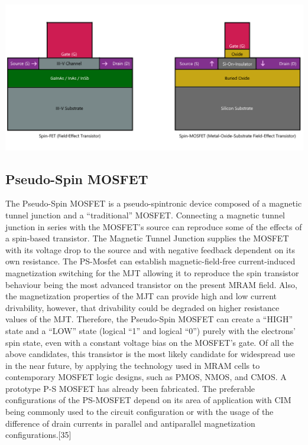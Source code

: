 \documentclass{article}
\begin{document}
\begin{center}
\includegraphics[scale=0.4]{SpinTransistorsBantis.png}
\end{center}

\subsection{Pseudo-Spin MOSFET}
The Pseudo-Spin MOSFET is a pseudo-spintronic device composed of a magnetic tunnel junction and a  “traditional” MOSFET. Connecting a magnetic tunnel junction in series with the MOSFET’s source can reproduce some of the effects of a spin-based transistor. The Magnetic Tunnel Junction supplies the MOSFET with its voltage drop to the source and with negative feedback dependent on its own resistance. The PS-Mosfet can establish magnetic-field-free current-induced magnetization switching for the MJT allowing it to reproduce the spin transistor behaviour being the most advanced transistor on the present MRAM field. Also, the magnetization properties of the MJT can provide high and low current drivability, however, that drivability could be degraded on higher resistance values of the MJT. Therefore, the Pseudo-Spin MOSFET can create a “HIGH” state and a “LOW” state (logical “1” and logical “0”) purely with the electrons’ spin state, even with a constant voltage bias on the MOSFET’s gate. Of all the above candidates, this transistor is the most likely candidate for widespread use in the near future, by applying the technology used in MRAM cells to contemporary MOSFET logic designs, such as PMOS, NMOS, and CMOS. A prototype P-S MOSFET has already been fabricated. The preferable configurations of the PS-MOSFET depend on its area of application with CIM being commonly used to the circuit configuration or with the usage of the difference of drain currents in parallel and antiparallel magnetization configurations.[35]	
\end{document}
